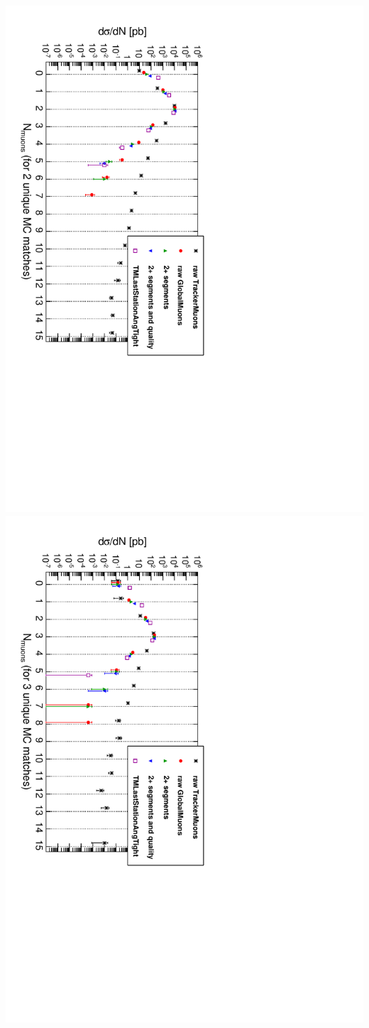 \documentclass[compress]{beamer}
\begin{document}
\begin{frame}
\includegraphics[height=0.5\linewidth, angle=90]{tracks_samepage_2real.pdf}
\includegraphics[height=0.5\linewidth, angle=90]{tracks_samepage_3real.pdf}
\end{frame}
\end{document}
